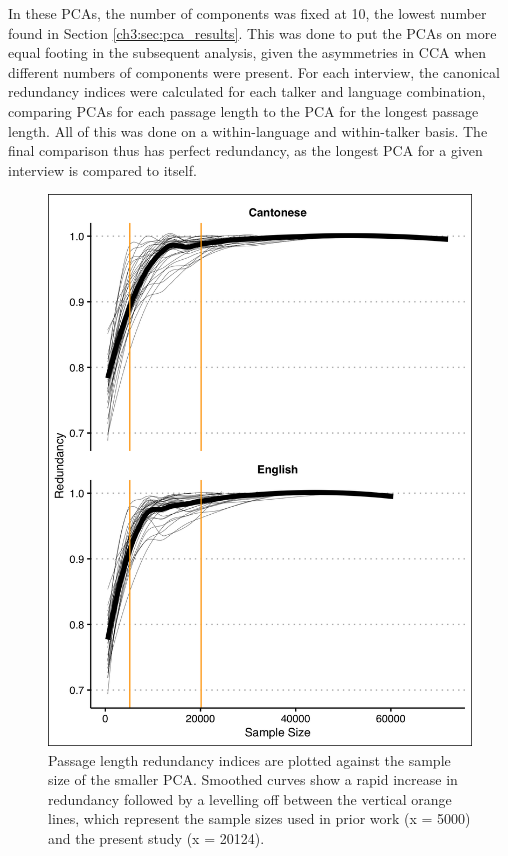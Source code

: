 In these PCAs, the number of components was fixed at 10, the lowest number found in Section \ref{ch3:sec:pca_results}. This was done to put the PCAs on more equal footing in the subsequent analysis, given the asymmetries in CCA when different numbers of components were present. For each interview, the canonical redundancy indices were calculated for each talker and language combination, comparing PCAs for each passage length to the PCA for the longest passage length. All of this was done on a within-language and within-talker basis. The final comparison thus has perfect redundancy, as the longest PCA for a given interview is compared to itself.

\begin{figure}[htbp]
    \begin{center}
    \includegraphics[width=0.9\linewidth]{figures/ch3_passagelength.png} 
    \caption{Passage length redundancy indices are plotted against the sample size of the smaller PCA. Smoothed curves show a rapid increase in redundancy followed by a levelling off between the vertical orange lines, which represent the sample sizes used in prior work (x = 5000) and the present study (x = 20124).}
    \label{ch3:fig:passagelength}
    \end{center}
\end{figure}

